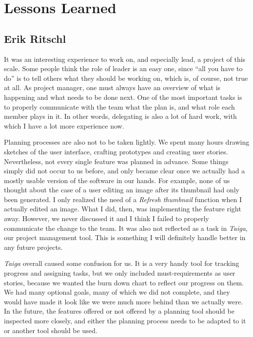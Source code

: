 \section{Lessons Learned}
\def\kapitelautor{}

\subsection{Erik Ritschl}

It was an interesting experience to work on, and especially lead, a project of
this scale. Some people think the role of leader is an easy one, since ``all you
have to do'' is to tell others what they should be working on, which is, of
course, not true at all. As project manager, one must always have an overview of
what is happening and what needs to be done next. One of the most important
tasks is to properly communicate with the team what the plan is, and what role
each member plays in it. In other words, delegating is also a lot of hard work,
with which I have a lot more experience now.

Planning processes are also not to be taken lightly. We spent many hours drawing
sketches of the user interface, crafting prototypes and creating user stories.
Nevertheless, not every single feature was planned in advance. Some things
simply did not occur to us before, and only became clear once we actually had a
mostly usable version of the software in our hands. For example, none of us
thought about the case of a user editing an image after its thumbnail had only
been generated. I only realized the need of a \emph{Refresh thumbnail} function
when I actually edited an image. What I did, then, was implementing the feature
right away. However, we never discussed it and I think I failed to properly
communicate the change to the team. It was also not reflected as a task in
\emph{Taiga}, our project management tool. This is something I will definitely
handle better in any future projects.

\emph{Taiga} overall caused some confusion for us. It is a very handy tool for
tracking progress and assigning tasks, but we only included must-requirements as
user stories, because we wanted the burn down chart to reflect our progress on
them. We had many optional goals, many of which we did not complete, and they
would have made it look like we were much more behind than we actually were. In
the future, the features offered or not offered by a planning tool should be
inspected more closely, and either the planning process needs to be adapted to
it or another tool should be used.

